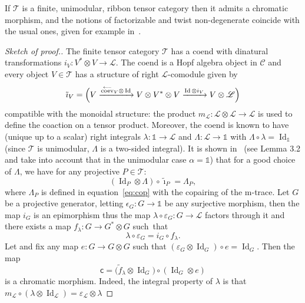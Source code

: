 \documentclass[pdftex]{sigma}
\numberwithin{equation}{section}
\newcommand{\tto}{\xrightarrow}
\newcommand{\chr}{{\mathsf{c}}}
\numberwithin{theorem}{section}
\numberwithin{proposition}{section}
\numberwithin{definition}{section}
\numberwithin{lemma}{section}
\numberwithin{corollary}{section}
\numberwithin{remark}{section}
\numberwithin{example}{section}
\newcommand{\rev}{\stackrel{\longrightarrow}{\operatorname{ev}}\!\!}
\newcommand{\lcoev}{\stackrel{\longleftarrow}{\operatorname{coev}}}
\newcommand{\ci}{\tilde\imath}
\newcommand{\cat}{\mathcal{C}}
\newcommand{\ttt}{\mathcal{T}}
\newcommand{\coend}{\mathscr{L}}
\newcommand{\unit}{\ensuremath{\mathds{1}}}
\newcommand{\Id}{\operatorname{Id}}
\newcommand{\ve}{\varepsilon}
\newcommand{\wt}{\widetilde}
\begin{document}
\begin{theorem}%
If $\ttt$ is a finite, unimodular, ribbon tensor category then it admits a chromatic morphism, and the notions
of factorizable and twist non-degenerate coincide with the usual ones, given for example in~{\rm \cite{DRGGPMR2022}}.
\end{theorem}
\begin{proof}[Sketch of proof.]
The finite
tensor category $\ttt$ has a coend
\smash{$\coend=\int^{V\in\cat}V^*\otimes V$} with dinatural transformations
$i_V\colon V^*\otimes V\to \coend$. The coend is a Hopf algebra object in
$\cat$ and every object $V\in\ttt$ has a structure of right
$\coend$-comodule given by
\[
\ci_V=\Bigl(V\tto {\lcoev_V\otimes\Id}V\otimes V^*\otimes V\tto
{\Id\otimes i_V}V\otimes\coend\Bigr)
\]
compatible with the monoidal
structure: the product $m_{\!\coend}\colon \coend\otimes\coend\to\coend$ is
used to define the coaction on a tensor product. Moreover, the coend
is known to have (unique up to a scalar) right integrals
$\lambda\colon \unit\to \coend$ and $\Lambda\colon \coend\to\unit$ with
$\Lambda\circ\lambda=\Id_\unit$ (since $\ttt$ is unimodular, $\Lambda$
is a two-sided integral). It is shown in~\cite{CGPV2023b}
(see Lemma 3.2 and take into account that in the unimodular case $\alpha=\unit$) that for a
good choice of $\Lambda$, we have for any projective $P\in\ttt$:
\begin{equation}
 \label{eq:Lambda_coend}
 (\Id_P\otimes\Lambda)\circ\ci_P=\Lambda_P,
\end{equation}
where $\Lambda_P$ is defined in equation~\eqref{eq:cop} with the
copairing of the m-trace. Let $G$ be a projective generator, letting $\epsilon_G\colon G\to \unit$ be any surjective morphism, then the
map $i_G$ is an epimorphism thus the map
$\lambda\circ\ve_G\colon G\to\coend$ factors through it and there exists a
map $f_\lambda\colon G\to G^*\otimes G$ such~that%
\begin{equation}
 \label{eq:flambda}
 \lambda\circ\ve_G=i_G\circ f_\lambda .
\end{equation}
 Let
\smash{$\wt f_\lambda=\bigl(\rev_G\otimes\Id_G\bigr)\circ(\Id_G\otimes f_\lambda)$} and
fix any map $e\colon G\to G\otimes G$ such that
$(\ve_G\otimes\Id_G)\circ e
=\Id_G$. Then the map
\begin{equation}
 \label{eq:chrcoend}
\chr=\bigl(\wt f_\lambda\otimes\Id_G\bigr)\circ(\Id_G\otimes e
)
\end{equation}
is a chromatic morphism. Indeed, the integral property of $\lambda$ is
that
$m_\coend\circ(\lambda\otimes \Id_\coend)=\ve_\coend\otimes \lambda$

\end{proof}
\end{document}
